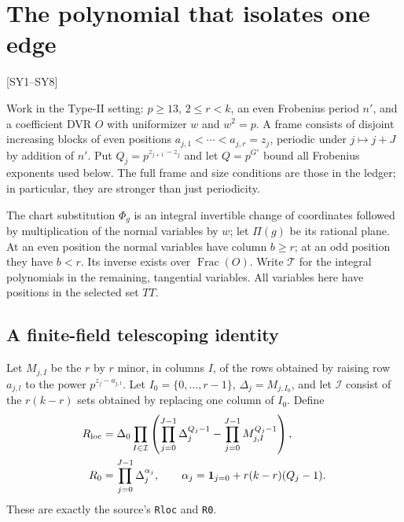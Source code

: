 \section{The polynomial that isolates one edge}\label{sec:symbols}

 \textsf{[SY1--SY8]}

Work in the Type-II setting: $p\ge13$, $2\le r<k$, an even Frobenius period $n'$, and a coefficient DVR $O$ with uniformizer $w$ and $w^2=p$. A frame consists of disjoint increasing blocks of even positions $a_{j,1}<\cdots<a_{j,r}=z_j$, periodic under $j\mapsto j+J$ by addition of $n'$. Put $Q_j=p^{z_{j+1}-z_j}$ and let $Q=p^{G'}$ bound all Frobenius exponents used below. The full frame and size conditions are those in the ledger; in particular, they are stronger than just periodicity.

The chart substitution $\Phi_g$ is an integral invertible change of coordinates followed by multiplication of the normal variables by $w$; let $\Pi(g)$ be its rational plane. At an even position the normal variables have column $b\ge r$; at an odd position they have $b<r$. Its inverse exists over $\operatorname{Frac}(O)$. Write $\mathcal T$ for the integral polynomials in the remaining, tangential variables. All variables here have positions in the selected set $TT$.

\subsection{A finite-field telescoping identity}

Let $M_{j,I}$ be the $r$ by $r$ minor, in columns $I$, of the rows obtained by raising row $a_{j,l}$ to the power $p^{z_j-a_{j,l}}$. Let $I_0=\{0,\ldots,r-1\}$, $\Delta_j=M_{j,I_0}$, and let $\mathcal I$ consist of the $r(k-r)$ sets obtained by replacing one column of $I_0$. Define
\begin{align}
R_{\rm loc}&=\Delta_0\prod_{I\in\mathcal I}
 \left(\prod_{j=0}^{J-1}\Delta_j^{Q_j-1}
             -\prod_{j=0}^{J-1}M_{j,I}^{Q_j-1}\right),\label{eq:sy-localizer}\\
R_0&=\prod_{j=0}^{J-1}\Delta_j^{\alpha_j},\qquad
\alpha_j=\mathbf1_{j=0}+r(k-r)(Q_j-1).
\end{align}
These are exactly the source's \texttt{Rloc} and \texttt{R0}.\cite{symbol-source,symbol-elementary}

